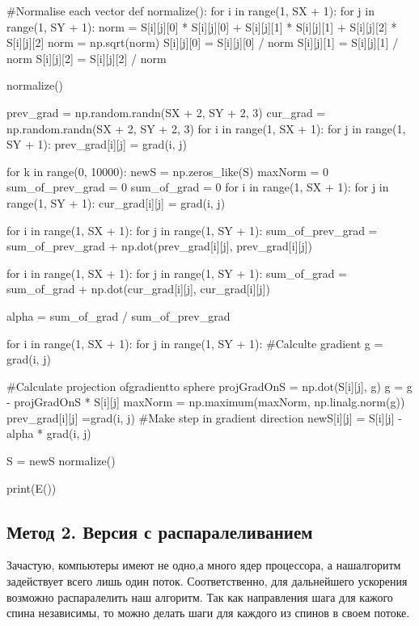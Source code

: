 \documentclass[ 12pt,x11names]{article}
\begin{document}
\begin{python}
#Normalise each vector
def normalize():
    for i in range(1, SX + 1):
        for j in range(1, SY + 1):
            norm = S[i][j][0] * S[i][j][0] + S[i][j][1] * S[i][j][1] + S[i][j][2] * S[i][j][2]
            norm = np.sqrt(norm)
            S[i][j][0] = S[i][j][0] / norm
            S[i][j][1] = S[i][j][1] / norm
            S[i][j][2] = S[i][j][2] / norm

normalize()

prev_grad =  np.random.randn(SX + 2, SY + 2, 3)
cur_grad = np.random.randn(SX + 2, SY + 2, 3)
for i in range(1, SX + 1):
    for j in range(1, SY + 1):
        prev_grad[i][j] = grad(i, j)

for k in range(0, 10000):
    newS = np.zeros_like(S)
    maxNorm = 0
    sum_of_prev_grad = 0
    sum_of_grad  =  0
    for i in range(1, SX + 1):
        for j in range(1, SY + 1):
            cur_grad[i][j] = grad(i,  j)

    for i in range(1, SX + 1):
        for j in range(1, SY + 1):
            sum_of_prev_grad = sum_of_prev_grad + np.dot(prev_grad[i][j], prev_grad[i][j])

    for i in range(1, SX + 1):
        for j in range(1, SY + 1):
            sum_of_grad = sum_of_grad + np.dot(cur_grad[i][j], cur_grad[i][j])

    alpha = sum_of_grad / sum_of_prev_grad

    for i in range(1, SX + 1):
        for j in range(1, SY + 1):
            #Calculte gradient
            g = grad(i,  j)

            #Calculate projection ofgradientto sphere
            projGradOnS = np.dot(S[i][j], g)
            g = g - projGradOnS * S[i][j]
            maxNorm = np.maximum(maxNorm, np.linalg.norm(g))
            prev_grad[i][j] =grad(i, j)
            #Make step in gradient direction
            newS[i][j] = S[i][j] - alpha * grad(i, j)

    S = newS
    normalize()

print(E())

 \end{python}
 \subsection{Метод 2. Версия с распаралеливанием}
 Зачастую, компьютеры имеют не одно,а много ядер процессора, а нашалгоритм задействует всего лишь один  поток. Соответственно, для дальнейшего ускорения возможно распаралелить наш алгоритм.
 Так как направления шага для кажого спина независимы, то можно делать шаги для каждого из спинов в своем потоке.
  \begin{python}
  \end{python}
\newpage
\end{document}
